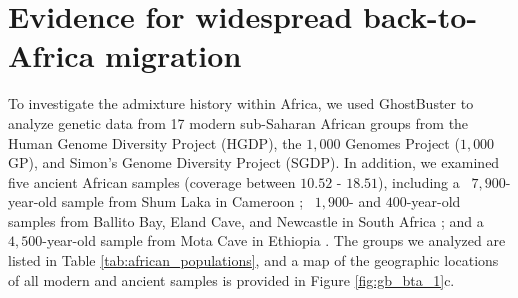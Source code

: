 \section{Evidence for widespread back-to-Africa migration}
\label{sec:ch3-gb-bta}

To investigate the admixture history within Africa, we used GhostBuster to analyze genetic data from 17 modern sub-Saharan African groups from the Human Genome Diversity Project (HGDP), the $1{,}000$ Genomes Project ($1{,}000$ GP), and Simon's Genome Diversity Project (SGDP). In addition, we examined five ancient African samples (coverage between $10.52$ - $18.51$), including a ~$7{,}900$-year-old sample from Shum Laka in Cameroon \cite{lipson2020ancient}; ~$1{,}900$- and $400$-year-old samples from Ballito Bay, Eland Cave, and Newcastle in South Africa \cite{schlebusch2017southern}; and a ~$4{,}500$-year-old sample from Mota Cave in Ethiopia \cite{llorente2015ancient}. The groups we analyzed are listed in Table \ref{tab:african_populations}, and a map of the geographic locations of all modern and ancient samples is provided in Figure \ref{fig:gb_bta_1}c.

